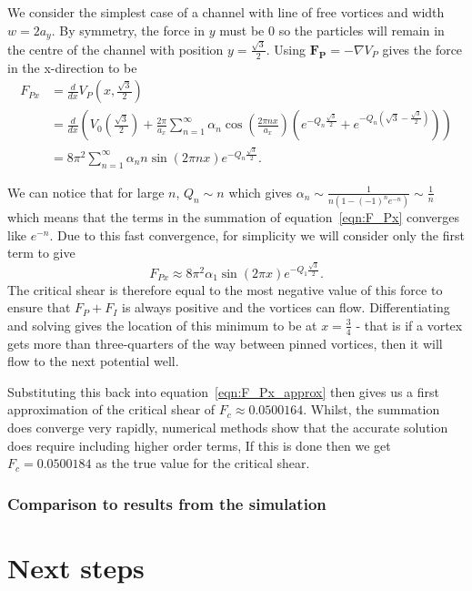 \documentclass{article}
\numberwithin{equation}{section}
\begin{document}
We consider the simplest case of a channel with line of free vortices and width $w=2a_y$. By symmetry, the force in $y$ must be $0$ so the particles will remain in the centre of the channel with position $y=\frac{\sqrt{3}}{2}$.
Using $\mathbf{F_P} = -\nabla V_P$ gives the force in the x-direction to be
\begin{align}
    F_{Px} &= \frac{d}{dx}V_P(x, \frac{\sqrt{3}}{2}) \nonumber \\
    &= \frac{d}{dx}\left(V_0\left(\frac{\sqrt{3}}{2}\right) + \frac{2\pi}{a_x}\sum_{n=1}^\infty\alpha_n\cos\left(\frac{2\pi nx}{a_x}\right) \left(e^{-Q_n\frac{\sqrt{3}}{2}}+e^{-Q_n(\sqrt{3}-\frac{\sqrt{3}}{2})}\right)\right) \nonumber \\
    &= 8\pi^2\sum_{n=1}^\infty\alpha_nn\sin(2\pi nx) e^{-Q_n\frac{\sqrt{3}}{2}}. \label{eqn:F_Px}
\end{align}

We can notice that for large $n$, $Q_n\sim n$ which gives $\alpha_n\sim \frac{1}{n(1-(-1)^ne^{-n})}\sim\frac{1}{n}$ which means that the terms in the summation of equation~\ref{eqn:F_Px} converges like $e^{-n}$. Due to this fast convergence, for simplicity we will consider only the first term to give
\begin{equation}
    F_{Px} \approx 8\pi^2\alpha_1\sin(2\pi x) e^{-Q_1\frac{\sqrt{3}}{2}}. \label{eqn:F_Px_approx}
\end{equation}
The critical shear is therefore equal to the most negative value of this force to ensure that $F_P + F_I$ is always positive and the vortices can flow. Differentiating and solving gives the location of this minimum to be at $x=\frac{3}{4}$ - that is if a vortex gets more than three-quarters of the way between pinned vortices, then it will flow to the next potential well.

Substituting this back into equation~\ref{eqn:F_Px_approx} then gives us a first approximation of the critical shear of $F_c \approx 0.0500164$. Whilst, the summation does converge very rapidly, numerical methods show that the accurate solution does require including higher order terms, If this is done then we get $F_c = 0.0500184$ \cite{Gartlan2020NovelFibres} as the true value for the critical shear.

\subsubsection{Comparison to results from the simulation}


\section{Next steps}
\end{document}
